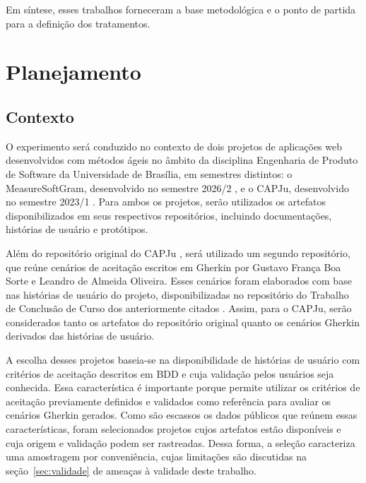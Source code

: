 Em síntese, esses trabalhos forneceram a base metodológica e o ponto de partida para a definição dos tratamentos. 

\section{Planejamento}
\label{sec:planejamento}

\subsection{Contexto}
O experimento será conduzido no contexto de dois projetos de aplicações web desenvolvidos com métodos ágeis no âmbito da disciplina Engenharia de Produto de Software da Universidade de Brasília, em semestres distintos: o MeasureSoftGram, desenvolvido no semestre 2026/2 \cite{measuresoftgram2026doc}, e o CAPJu, desenvolvido no semestre 2023/1 \cite{capju2023doc}. Para ambos os projetos, serão utilizados os artefatos disponibilizados em seus respectivos repositórios, incluindo documentações, histórias de usuário e protótipos.

Além do repositório original do CAPJu \cite{capju2023doc}, será utilizado um segundo repositório, que reúne cenários de aceitação escritos em Gherkin por Gustavo França Boa Sorte e Leandro de Almeida Oliveira. Esses cenários foram elaborados com base nas histórias de usuário do projeto, disponibilizadas no repositório do Trabalho de Conclusão de Curso dos anteriormente citados \cite{capju2026cenarios} . Assim, para o CAPJu, serão considerados tanto os artefatos do repositório original quanto os cenários Gherkin derivados das histórias de usuário.

A escolha desses projetos baseia-se na disponibilidade de histórias de usuário com critérios de aceitação descritos em BDD e cuja validação pelos usuários seja conhecida. Essa característica é importante porque permite utilizar os critérios de aceitação previamente definidos e validados como referência para avaliar os cenários Gherkin gerados. Como são escassos os dados públicos que reúnem essas características, foram selecionados projetos cujos artefatos estão disponíveis e cuja origem e validação podem ser rastreadas. Dessa forma, a seleção caracteriza uma amostragem por conveniência, cujas limitações são discutidas na seção~\ref{sec:validade} de ameaças à validade deste trabalho.

